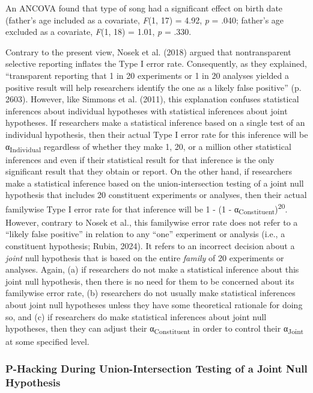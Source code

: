 \documentclass[authordate, empirical]{jote-new-article}
\begin{document}
	An ANCOVA found that type of song had a significant effect on birth date (father's age included as a covariate, \emph{F}(1, 17) = 4.92, \emph{p} = .040; father's age excluded as a covariate, \emph{F}(1, 18) = 1.01, \emph{p} = .330.



	Contrary to the present view, Nosek et al. (2018) argued that nontransparent selective reporting inflates the Type I error rate. Consequently, as they explained, “transparent reporting that 1 in 20 experiments or 1 in 20 analyses yielded a positive result will help researchers identify the one as a likely false positive” (p. 2603). However, like Simmons et al. (2011), this explanation confuses statistical inferences about individual hypotheses with statistical inferences about joint hypotheses. If researchers make a statistical inference based on a single test of an individual hypothesis, then their actual Type I error rate for this inference will be α\textsubscript{Individual} regardless of whether they make 1, 20, or a million other statistical inferences and even if their statistical result for that inference is the only significant result that they obtain or report. On the other hand, if researchers make a statistical inference based on the union-intersection testing of a joint null hypothesis that includes 20 constituent experiments or analyses, then their actual familywise Type I error rate for that inference will be 1 - (1 - α\textsubscript{Constituent})\textsuperscript{20}. However, contrary to Nosek et al., this familywise error rate does not refer to a “likely false positive” in relation to any “one” experiment or analysis (i.e., a constituent hypothesis; Rubin, 2024). It refers to an incorrect decision about a \emph{joint} null hypothesis that is based on the entire\emph{ family} of 20 experiments or analyses. Again, (a) if researchers do not make a statistical inference about this joint null hypothesis, then there is no need for them to be concerned about its familywise error rate, (b) researchers do not usually make statistical inferences about joint null hypotheses unless they have some theoretical rationale for doing so, and (c) if researchers do make statistical inferences about joint null hypotheses, then they can adjust their α\textsubscript{Constituent }in order to control their α\textsubscript{Joint }at some specified level.



	\subsubsection{P-Hacking During Union-Intersection Testing of a Joint Null Hypothesis}
\end{document}
